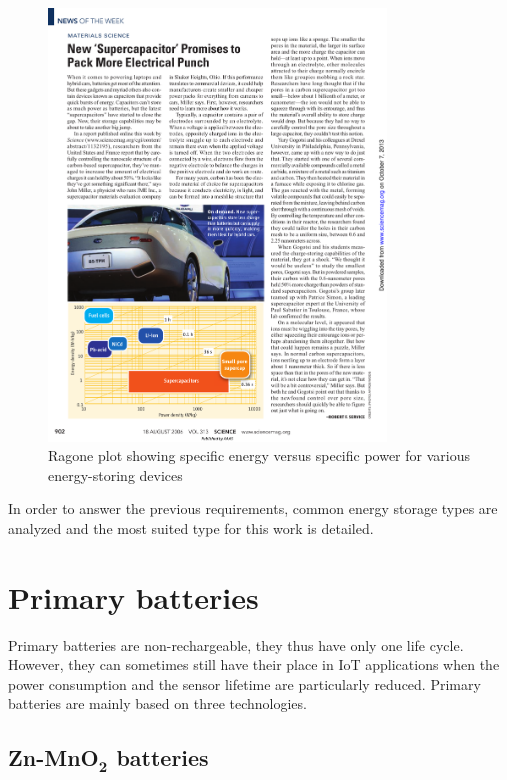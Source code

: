 \documentclass{EPL-master-thesis-covers-EN}
\begin{document}
\begin{figure}[H]
    \centering
    \includegraphics[width=0.8\textwidth]{service2006.pdf}
    \caption[Ragone plot showing specific energy versus specific power for various energy-storing devices]{Ragone plot showing specific energy versus specific power for various energy-storing devices~\cite{Service902}}
    \label{fig:ragone_plot}
\end{figure}

In order to answer the previous requirements, common energy storage types are analyzed and the most suited type for this work is detailed.


\section{Primary batteries}

Primary batteries are non-rechargeable, they thus have only one life cycle. However, they can sometimes still have their place in IoT applications when the power consumption and the sensor lifetime are particularly reduced. Primary batteries are mainly based on three technologies.

\subsection*{Zn-MnO${}_{\textbf{2}}$ batteries}
\end{document}
